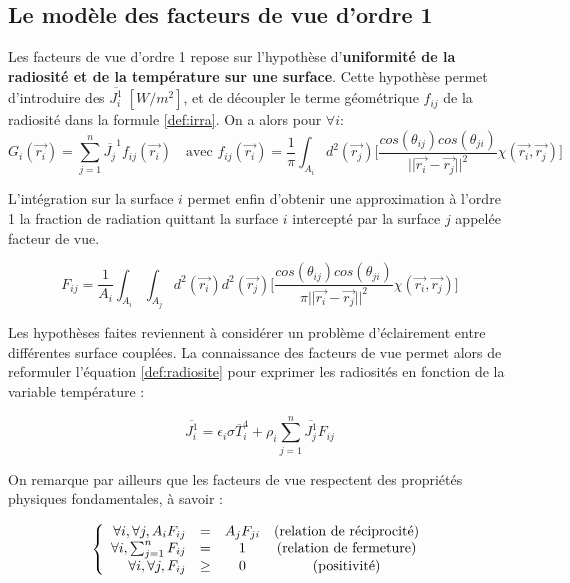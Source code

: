 
\subsection{Le modèle des facteurs de vue d'ordre 1}
Les facteurs de vue d'ordre 1 repose sur l'hypothèse d'\textbf{uniformité de la radiosité et de la température sur une surface}. Cette hypothèse permet d'introduire des $\overline{J_i^1} \; [W/m^2]$, et de découpler le terme géométrique $f_{ij}$ de la radiosité dans la formule \ref{def:irra}.  On a alors pour $\forall i$:
\begin{equation}
    G_i(\vec{r_i}) = \sum_{j = 1}^{n} \overline{J_j}^1 f_{ij}(\vec{r_i}) \quad \text{avec } f_{ij}(\vec{r_i}) =\frac{1}{\pi} \int_{A_i} d^2(\vec{r_j})\bigg[\frac{cos(\theta_{ij})cos(\theta_{ji})}{||\vec{r_i}-\vec{r_j}||^2} \chi{(\vec{r_i},\vec{r_j})}\bigg] 
\end{equation}

L'intégration sur la surface $i$ permet enfin d'obtenir une approximation à l'ordre 1 la fraction de radiation quittant la surface $i$ intercepté par la surface $j$ appelée facteur de vue.

\begin{equation}
    \label{fv}
    F_{ij} = \frac{1}{A_i} \int_{A_i} \int_{A_j} d^2(\vec{r_i}) d^2(\vec{r_j})\bigg[\frac{cos(\theta_{ij})cos(\theta_{ji})}{\pi ||\vec{r_i}-\vec{r_j}||^2} \chi(\vec{r_i},\vec{r_j})\bigg] 
\end{equation}


Les hypothèses faites reviennent à considérer un problème d'éclairement entre différentes surface couplées. La connaissance des facteurs de vue permet alors de reformuler l'équation \ref{def:radiosite} pour exprimer les radiosités en fonction de la variable température : 

\begin{equation}
    \overline{J_i^1} = \epsilon_i \sigma \overline{T}^4_i  + \rho_i \sum_{j=1}^{n} \overline{J_j^1} F_{ij}
\end{equation}


On remarque par ailleurs que les facteurs de vue respectent des propriétés physiques fondamentales, à savoir :

\begin{equation}    
    \left\lbrace
    \begin{array}{r c c c  }
    
      \forall i ,\forall j, A_i F_{ij} & = & A_j F_{ji} & \text{(relation de réciprocité)}\\
      \forall i , \sum_{j = 1}^n F_{ij} & = & 1 & \text{(relation de fermeture)}\\ 
      \forall i ,\forall j, F_{ij} & \geq & 0 & \text{(positivité)}
    \end{array}\right.
\end{equation}
\label{def:fv}

